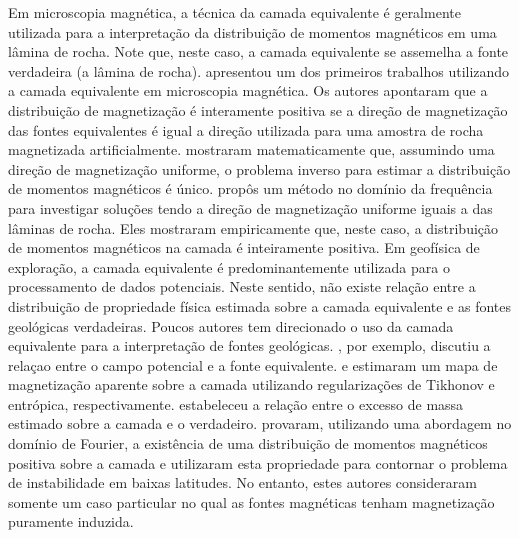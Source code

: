Em microscopia magnética, a técnica da camada equivalente é geralmente utilizada para a interpretação da distribuição de momentos magnéticos em uma lâmina de rocha. Note que, neste caso, a camada equivalente se assemelha a fonte verdadeira (a lâmina de rocha). \cite{weiss2007} apresentou um dos primeiros trabalhos utilizando a camada equivalente em microscopia magnética. Os autores apontaram que a distribuição de magnetização é interamente positiva se a direção de magnetização das fontes equivalentes é igual a direção utilizada para uma amostra de rocha magnetizada artificialmente. \cite{baratchart2013} mostraram matematicamente que, assumindo uma direção de magnetização uniforme, o problema inverso para estimar a distribuição de momentos magnéticos é único. \cite{lima2013} propôs um método no domínio da frequência para investigar soluções tendo a direção de magnetização uniforme iguais a das lâminas de rocha. Eles mostraram empiricamente que, neste caso, a distribuição de momentos magnéticos na camada é inteiramente positiva.  Em geofísica de exploração, a camada equivalente é predominantemente utilizada para o processamento de dados potenciais. Neste sentido, não existe relação entre a distribuição de propriedade física estimada sobre a camada equivalente e as fontes geológicas verdadeiras. Poucos autores tem direcionado o uso da camada equivalente para a interpretação de fontes geológicas. \cite{pedersen1991}, por exemplo, discutiu a relaçao entre o campo potencial e a fonte equivalente. \cite{medeiros_silva1996} e \cite{silva-etal2010} estimaram um mapa de magnetização aparente sobre a camada utilizando regularizações de Tikhonov e entrópica, respectivamente. \cite{siqueira_etal_2017} estabeleceu a relação entre o excesso de massa estimado sobre a camada e o verdadeiro. \cite{li_etal_2014} provaram, utilizando uma abordagem no domínio de Fourier, a existência de uma distribuição de momentos magnéticos positiva sobre a camada e utilizaram esta propriedade para contornar o problema de instabilidade em baixas latitudes. No entanto, estes autores consideraram somente um caso particular no qual as fontes magnéticas tenham magnetização puramente induzida. 

